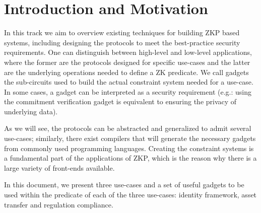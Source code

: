 \section{Introduction and Motivation}
\label{apps:intro}
 
In this track we aim to overview existing techniques for building ZKP based systems, including designing the protocols to meet the best-practice security requirements. One can distinguish between high-level and low-level applications, where the former are the protocols designed for specific use-cases and the latter are the underlying operations needed to define a ZK predicate. We call gadgets the sub-circuits used to build the actual constraint system needed for a use-case. In some cases, a gadget can be interpreted as a security requirement (e.g.: using the commitment verification gadget is equivalent to ensuring the privacy of underlying data). 

As we will see, the protocols can be abstracted and generalized to admit several use-cases; similarly, there exist compilers that will generate the necessary gadgets from commonly used programming languages. Creating the constraint systems is a fundamental part of the applications of ZKP, which is the reason why there is a large variety of front-ends available.

In this document, we present three use-cases and a set of useful gadgets to be used within the predicate of each of the three use-cases: identity framework, asset transfer and regulation compliance.



